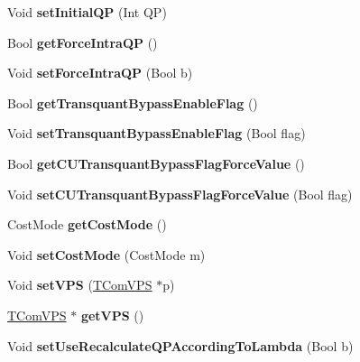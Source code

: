 \begin{DoxyCompactItemize}
Void {\bfseries set\+Initial\+QP} (Int QP)
\item 
\mbox{\label{class_t_enc_cfg_aed544181f811fc29bf6e3f32834c1f53}} 
Bool {\bfseries get\+Force\+Intra\+QP} ()
\item 
\mbox{\label{class_t_enc_cfg_ad930f6c622cda495786fd761ca25a710}} 
Void {\bfseries set\+Force\+Intra\+QP} (Bool b)
\item 
\mbox{\label{class_t_enc_cfg_a1187cff4f63c84ca41eb41b0ba3ad061}} 
Bool {\bfseries get\+Transquant\+Bypass\+Enable\+Flag} ()
\item 
\mbox{\label{class_t_enc_cfg_aa30302349d952ed86e878337a28844a2}} 
Void {\bfseries set\+Transquant\+Bypass\+Enable\+Flag} (Bool flag)
\item 
\mbox{\label{class_t_enc_cfg_a69e2af0e40516b05d96c12a3edd19df8}} 
Bool {\bfseries get\+C\+U\+Transquant\+Bypass\+Flag\+Force\+Value} ()
\item 
\mbox{\label{class_t_enc_cfg_a00f37a4a93bda86a2d8f8ee345cd81fa}} 
Void {\bfseries set\+C\+U\+Transquant\+Bypass\+Flag\+Force\+Value} (Bool flag)
\item 
\mbox{\label{class_t_enc_cfg_ae6ef84d9634bd11b22fc5729557aeda7}} 
Cost\+Mode {\bfseries get\+Cost\+Mode} ()
\item 
\mbox{\label{class_t_enc_cfg_aeecab100a923b2b2c6fffbb798c56d64}} 
Void {\bfseries set\+Cost\+Mode} (Cost\+Mode m)
\item 
\mbox{\label{class_t_enc_cfg_a2f0747b3cdd1e6b18307ed22fc4d65b7}} 
Void {\bfseries set\+V\+PS} (\hyperlink{class_t_com_v_p_s}{T\+Com\+V\+PS} $\ast$p)
\item 
\mbox{\label{class_t_enc_cfg_afccdb5c84d1fffed9084b92676fb25c4}} 
\hyperlink{class_t_com_v_p_s}{T\+Com\+V\+PS} $\ast$ {\bfseries get\+V\+PS} ()
\item 
\mbox{\label{class_t_enc_cfg_ab1f7dc745bdb1da1d8d02e0296d12fdd}} 
Void {\bfseries set\+Use\+Recalculate\+Q\+P\+According\+To\+Lambda} (Bool b)

\end{DoxyCompactItemize}
